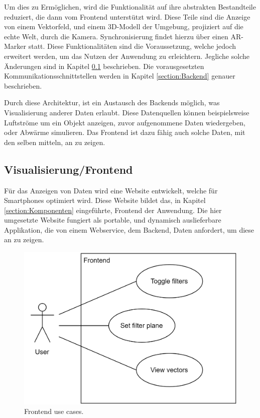 Um dies zu Ermöglichen, wird die Funktionalität auf ihre abstrakten
Bestandteile reduziert, die dann vom Frontend unterstützt wird.
Diese Teile sind die Anzeige von einem Vektorfeld, und einem
3D-Modell der Umgebung, projiziert auf die echte Welt, durch die
Kamera. Synchronisierung findet hierzu über einen AR-Marker statt.
Diese Funktionalitäten sind die Voraussetzung, welche jedoch
erweitert werden, um das Nutzen der Anwendung zu erleichtern.
Jegliche solche Änderungen sind in Kapitel \ref{section:Frontend}
beschrieben. Die vorausgesetzten Kommunikationsschnittstellen werden
in Kapitel \ref{section:Backend} genauer beschrieben.

Durch diese Architektur, ist ein Austausch des Backends möglich,
was Visualisierung anderer Daten erlaubt. Diese Datenquellen können
beispielsweise Luftströme um ein Objekt anzeigen, zuvor aufgenommene
Daten wiedergeben, oder Abwärme simulieren. Das Frontend ist dazu
fähig auch solche Daten, mit den selben mitteln, an zu zeigen.



\subsection{Visualisierung/Frontend}
\label{section:Frontend}
\FloatBarrier

Für das Anzeigen von Daten wird eine Website entwickelt, welche
für Smartphones optimiert wird. Diese Website bildet das, in Kapitel
\ref{section:Komponenten} eingeführte, Frontend der Anwendung.
Die hier umgesetzte Website fungiert als portable, und dynamisch
auslieferbare Applikation, die von einem Webservice, dem Backend,
Daten anfordert, um diese an zu zeigen.

\begin{figure}
	\centering
	\includegraphics[width=.6\linewidth]{images/frontend/UseCases}
	\caption{Frontend use cases.}
	\label{fig:frontendUseCase}
\end{figure}

